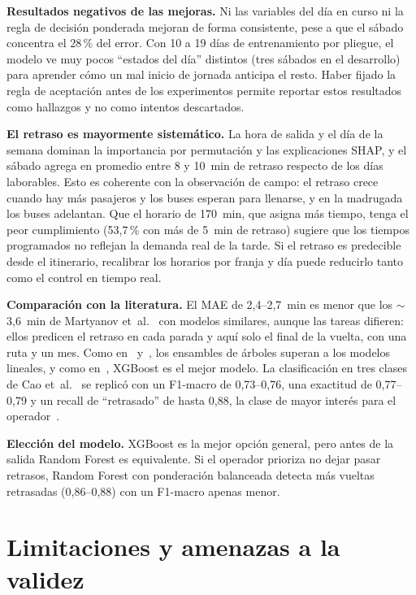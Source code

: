 \documentclass[conference]{IEEEtran}
\begin{document}
\textbf{Resultados negativos de las mejoras.} Ni las variables del día en curso ni la regla de decisión ponderada mejoran de forma consistente, pese a que el sábado concentra el 28\,\% del error. Con 10 a 19 días de entrenamiento por pliegue, el modelo ve muy pocos ``estados del día'' distintos (tres sábados en el desarrollo) para aprender cómo un mal inicio de jornada anticipa el resto. Haber fijado la regla de aceptación antes de los experimentos permite reportar estos resultados como hallazgos y no como intentos descartados.

\textbf{El retraso es mayormente sistemático.} La hora de salida y el día de la semana dominan la importancia por permutación y las explicaciones SHAP, y el sábado agrega en promedio entre 8 y 10~min de retraso respecto de los días laborables. Esto es coherente con la observación de campo: el retraso crece cuando hay más pasajeros y los buses esperan para llenarse, y en la madrugada los buses adelantan. Que el horario de 170~min, que asigna más tiempo, tenga el peor cumplimiento (53,7\,\% con más de 5~min de retraso) sugiere que los tiempos programados no reflejan la demanda real de la tarde. Si el retraso es predecible desde el itinerario, recalibrar los horarios por franja y día puede reducirlo tanto como el control en tiempo real.

\textbf{Comparación con la literatura.} El MAE de 2,4--2,7~min es menor que los $\sim$3,6~min de Martyanov et~al.~\cite{martyanov2026} con modelos similares, aunque las tareas difieren: ellos predicen el retraso en cada parada y aquí solo el final de la vuelta, con una ruta y un mes. Como en~\cite{martyanov2026} y~\cite{taparia2020}, los ensambles de árboles superan a los modelos lineales, y como en~\cite{meyer2023}, XGBoost es el mejor modelo. La clasificación en tres clases de Cao et~al.~\cite{cao2017} se replicó con un F1-macro de 0,73--0,76, una exactitud de 0,77--0,79 y un recall de ``retrasado'' de hasta 0,88, la clase de mayor interés para el operador~\cite{sun2021}.

\textbf{Elección del modelo.} XGBoost es la mejor opción general, pero antes de la salida Random Forest es equivalente. Si el operador prioriza no dejar pasar retrasos, Random Forest con ponderación balanceada detecta más vueltas retrasadas (0,86--0,88) con un F1-macro apenas menor.

\section{Limitaciones y amenazas a la validez}\label{sec:lim}
\end{document}

